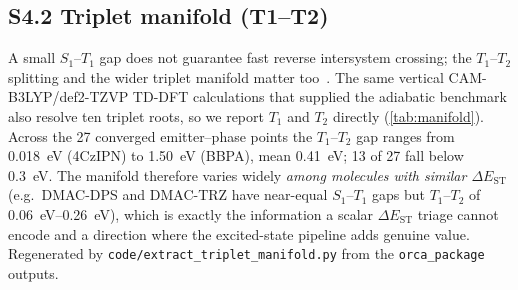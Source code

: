 \documentclass[twoside,twocolumn,9pt]{extarticle}
\begin{document}
\subsection*{S4.2 Triplet manifold (T1--T2)}\label{sec:triplet_manifold}
A small $S_1$--$T_1$ gap does not guarantee fast reverse intersystem crossing; the
$T_1$--$T_2$ splitting and the wider triplet manifold matter too~\cite{Keruckiene2024}.
The same vertical CAM-B3LYP/def2-TZVP TD-DFT calculations that supplied the adiabatic
benchmark also resolve ten triplet roots, so we report $T_1$ and $T_2$ directly
(\cref{tab:manifold}). Across the \num{27} converged emitter--phase points the $T_1$--$T_2$
gap ranges from \qty{0.018}{\electronvolt} (4CzIPN) to \qty{1.50}{\electronvolt} (BBPA),
mean \qty{0.41}{\electronvolt}; \num{13} of \num{27} fall below \qty{0.3}{\electronvolt}.
The manifold therefore varies widely \emph{among molecules with similar $\Delta E_\text{ST}$}
(e.g.\ DMAC-DPS and DMAC-TRZ have near-equal $S_1$--$T_1$ gaps but $T_1$--$T_2$ of
\qtyrange{0.06}{0.26}{\electronvolt}), which is exactly the information a scalar
$\Delta E_\text{ST}$ triage cannot encode and a direction where the excited-state pipeline
adds genuine value. Regenerated by \texttt{code/extract\_triplet\_manifold.py} from the
\texttt{orca\_package} outputs.
\end{document}
